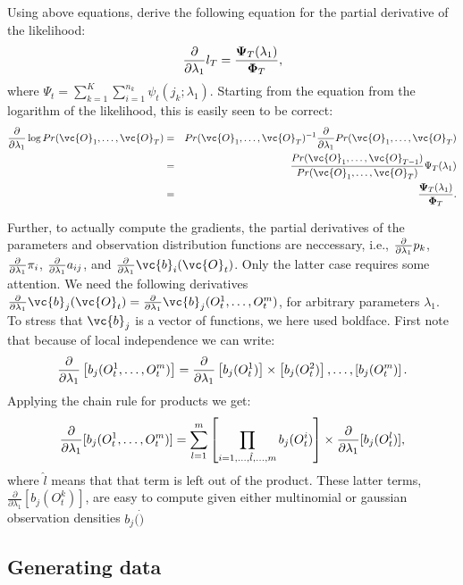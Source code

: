 Using above equations, \cite{Lystig2002} derive the following equation 
for the partial derivative of the likelihood:
\begin{equation}
	\frac{\partial} {\partial \lambda_{1}} l_{T}= 	
		\frac{\mathbf{\Psi}_{T}(\lambda_{1})}{\mathbf{\Phi}_{T}},
\end{equation}
where $\Psi_{t}=\sum_{k=1}^{K} \sum_{i=1}^{n_{k}} 
\psi_{t}(j_{k};\lambda_{1})$. 
Starting from the equation from the logarithm of the likelihood, this 
is easily seen to be correct: 
\begin{eqnarray*}
	\fpp \log Pr(\vc{O}_{1}, \ldots, \vc{O}_{T}) &=& Pr(\vc{O}_{1}, 
\ldots, \vc{O}_{T})^{-1} 
	\fpp Pr(\vc{O}_{1}, \ldots, \vc{O}_{T}) \\
	&=&  \frac{Pr(\vc{O}_{1}, \ldots, \vc{O}_{T-1})}{Pr(\vc{O}_{1}, 
\ldots, \vc{O}_{T})}  \Psi_{T} (\lambda_{1}) \\
	&=&  \frac{\mathbf{\Psi}_{T}(\lambda_{1})}{\mathbf{\Phi}_{T}}.
\end{eqnarray*}

Further, to actually compute the gradients, the partial derivatives of
the parameters and observation distribution functions are neccessary,
i.e., $\frac{\partial} {\partial \lambda_{1}} p_{k}$, $\frac{\partial} {\partial \lambda_{1}} \pi_{i}$, $\frac{\partial} {\partial \lambda_{1}} a_{ij}$, and $\fpp
\vc{b}_{i}(\vc{O}_{t})$.  Only the latter case requires some
attention.  We need the following derivatives $\fpp
\vc{b}_{j}(\vc{O}_{t})=\fpp \vc{b}_{j}(O_{t}^{1}, \ldots, O_{t}^{m})$, for
arbitrary parameters $\lambda_{1}$. To stress that $\vc{b}_{j}$ is a
vector of functions, we here used boldface. First note that because of local
independence we can write:
\begin{equation*}
	\frac{\partial} {\partial \lambda_{1}} \left[ b_{j}(O_{t}^{1}, \ldots, O_{t}^{m}) \right] = \frac{\partial} 
{\partial \lambda_{1} } \left[ b_{j}(O_{t}^{1}) \right] \times  
\left[ b_{j}(O_{t}^{2}) \right], \ldots,  \left[ b_{j}(O_{t}^{m}) \right].  
\end{equation*}
Applying the chain rule for products we get:
\begin{equation}
	\frac{\partial} {\partial \lambda_{1}} [b_{j}(O_{t}^{1}, \ldots, O_{t}^{m})] =
	\sum_{l=1}^{m} \left[ \prod_{i=1, \ldots, \hat{l}, \ldots, m} 
b_{j}(O_{t}^{i}) \right] \times
	\frac{\partial} {\partial \lambda_{1}}  [b_{j}(O_{t}^{l})],
	\label{partialProd}
\end{equation}
where $\hat{l}$ means that that term is left out of the product. 
These latter terms, $\frac{\partial} {\partial \lambda_{1} }  
[b_{j}(O_{t}^{k})]$, are easy to compute given either multinomial or 
gaussian observation densities $b_{j}(\dot)$

\subsection{Generating data}

